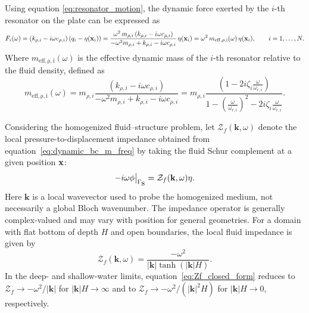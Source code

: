 Using equation \eqref{eq:resonator_motion}, the dynamic force exerted by the $i$-th resonator on the plate can be expressed as
\begin{equation}\label{eq:resonator_force}
    F_i(\omega) = \left(k_{\rho,i}-i\omega c_{\rho,i}\right)\left(q_i-\eta(\mathbf{x}_i)\right)=\frac{\omega^2 \,m_{\rho,i}\left(k_{\rho,i}-i\omega c_{\rho,i}\right)}{-\omega^2 m_{\rho,i}+k_{\rho,i}-i\omega c_{\rho,i}}\,\eta(\mathbf{x}_i)=\omega^2 \, m_{\mathrm{eff,\rho,i}}(\omega)\,\eta(\mathbf{x}_i),
    \qquad i=1,\ldots,N.
\end{equation}
Where $m_{\mathrm{eff,\rho,i}}(\omega)$ is the effective dynamic mass of the $i$-th resonator relative to the fluid density, defined as
\begin{equation}
    m_{\mathrm{eff,\rho,i}}(\omega)=m_{\rho,i}\frac{\left(k_{\rho,i}-i\omega c_{\rho,i}\right)}{-\omega^2 m_{\rho,i}+k_{\rho,i}-i\omega c_{\rho,i}}=m_{\rho,i}\frac{\left(1-2i\zeta_i \frac{\omega}{\omega_{r,i}}\right)}{1-\left(\frac{\omega}{\omega_{r,i}}\right)^2-2i\zeta_i \frac{\omega}{\omega_{r,i}}}.
\end{equation}

Considering the homogenized fluid--structure problem, let $\mathcal{Z}_f(\mathbf{k},\omega)$ denote the local pressure-to-displacement impedance obtained from equation~\eqref{eq:dynamic_bc_m_freq} by taking the fluid Schur complement at a given position $\mathbf{x}$:
\begin{equation}\label{eq:fluid_impedance}
    -i\omega\phi\big|_{\Gamma_{\mbox{s}}}=\mathcal{Z}_f(\mathbf{k},\omega)\eta.
\end{equation}
Here $\mathbf{k}$ is a local wavevector used to probe the homogenized medium, not necessarily a global Bloch wavenumber. The impedance operator is generally complex-valued and may vary with position for general geometries. For a domain with flat bottom of depth $H$ and open boundaries, the local fluid impedance is given by
\begin{equation}\label{eq:Zf_closed_form}
\mathcal Z_f(\mathbf{k},\omega)=\dfrac{-\omega^2}{|\mathbf{k}|\tanh(|\mathbf{k}|H)}.
\end{equation}
In the deep- and shallow-water limits, equation~\eqref{eq:Zf_closed_form} reduces to $\mathcal Z_f\to-\omega^2/|\mathbf{k}|$ for $|\mathbf{k}|H\to\infty$ and to $\mathcal Z_f\to-\omega^2/(|\mathbf{k}|^2H)$ for $|\mathbf{k}|H\to0$, respectively.

